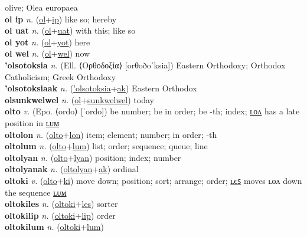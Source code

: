 olive; Olea europaea \label{'oliwa} \\
\textbf{ol ip} \textit{n.} (\hyperref[ol]{ol}+\hyperref[p]{ip})
like so; hereby \label{ol ip} \\
\textbf{ol uat} \textit{n.} (\hyperref[ol]{ol}+\hyperref[at]{uat})
with this; like so \label{ol uat} \\
\textbf{ol yot} \textit{n.} (\hyperref[ol]{ol}+\hyperref[ot]{yot})
here \label{ol yot} \\
\textbf{ol wel} \textit{n.} (\hyperref[ol]{ol}+\hyperref[el]{wel})
now \label{ol wel} \\
\textbf{'olsotoksia} \textit{n.} (Ell. ⟨Ορθοδοξία⟩ [orθoðoˈksia])
Eastern Orthodoxy; Orthodox Catholicism; Greek Orthodoxy \label{'olsotoksia} \\
\textbf{'olsotoksiaak} \textit{n.} (\hyperref['olsotoksia]{'olsotoksia}+\hyperref[ak]{ak})
Eastern Orthodox \label{'olsotoksiaak} \\
\textbf{olsunkwelwel} \textit{n.} (\hyperref[ol]{ol}+\hyperref[sunkwelwel]{sunkwelwel})
today \label{olsunkwelwel} \\
\textbf{olto} \textit{v.} (Epo. ⟨ordo⟩ [ˈordo])
be number; be in order; be -th; index; \hyperref[oltolon]{ʟᴏᴧ} has a late position in \hyperref[oltolum]{ʟᴜᴍ} \label{olto} \\
\textbf{oltolon} \textit{n.} (\hyperref[olto]{olto}+\hyperref[lon]{lon})
item; element; number; in order; -th \label{oltolon} \\
\textbf{oltolum} \textit{n.} (\hyperref[olto]{olto}+\hyperref[lum]{lum})
list; order; sequence; queue; line \label{oltolum} \\
\textbf{oltolyan} \textit{n.} (\hyperref[olto]{olto}+\hyperref[lyan]{lyan})
position; index; number \label{oltolyan} \\
\textbf{oltolyanak} \textit{n.} (\hyperref[oltolyan]{oltolyan}+\hyperref[ak]{ak})
ordinal \label{oltolyanak} \\
\textbf{oltoki} \textit{v.} (\hyperref[olto]{olto}+\hyperref[ki]{ki})
move down; position; sort; arrange; order; \hyperref[oltokiles]{ʟєꜱ} moves ʟᴏᴧ down the sequence \hyperref[oltokilum]{ʟᴜᴍ} \label{oltoki} \\
\textbf{oltokiles} \textit{n.} (\hyperref[oltoki]{oltoki}+\hyperref[les]{les})
sorter \label{oltokiles} \\
\textbf{oltokilip} \textit{n.} (\hyperref[oltoki]{oltoki}+\hyperref[lip]{lip})
order \label{oltokilip} \\
\textbf{oltokilum} \textit{n.} (\hyperref[oltoki]{oltoki}+\hyperref[lum]{lum})

